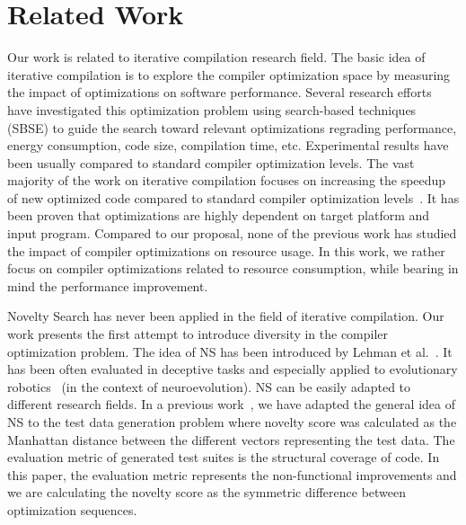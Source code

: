 \section{Related Work}
Our work is related to iterative compilation research field.
The basic idea of iterative compilation is to explore the compiler optimization space by measuring the impact of optimizations on software performance.
Several research efforts have investigated this optimization problem using search-based techniques (SBSE) to guide the search toward relevant optimizations regrading performance, energy consumption, code size, compilation time, etc. Experimental results have been usually compared to standard compiler optimization levels.  
The vast majority of the work on iterative compilation focuses on increasing the speedup of new optimized code compared to standard compiler optimization levels~\cite{almagor2004finding,hoste2008cole,pan2006fast,pallister2015identifying,chen2012deconstructing,martins2014exploration,lin2008automatic,martinez2014multi}.
It has been proven that optimizations are highly dependent on target platform and input program. 
Compared to our proposal, none of the previous work has studied the impact of compiler optimizations on resource usage. In this work, we rather focus on compiler optimizations related to resource consumption, while bearing in mind the performance improvement.

Novelty Search has never been applied in the field of iterative compilation. Our work presents the first attempt to introduce diversity in the compiler optimization problem. 
The idea of NS has been introduced by Lehman et al.~\cite{lehman2008exploiting}. It has been often evaluated in deceptive tasks and especially applied to evolutionary robotics~\cite{risi2010evolving,krvcah2012solving} (in the context of neuroevolution). 
NS can be easily adapted to different research fields. In a previous work~\cite{boussaa2015novelty}, we have adapted the general idea of NS to the test data generation problem where novelty score was calculated as the Manhattan distance between the different vectors representing the test data. The evaluation metric of generated test suites is the structural coverage of code.
In this paper, the evaluation metric represents the non-functional improvements and we are calculating the novelty score as the symmetric difference between optimization sequences. 


